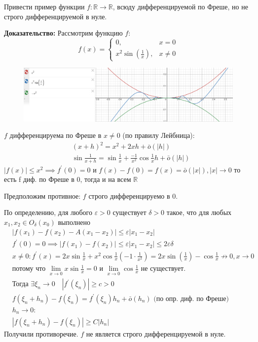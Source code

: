 \begin{task}
Привести пример функции $f: \mathbb{R} \rightarrow \mathbb{R}$, всюду дифференцируемой по Фреше, но не строго дифференцируемой в нуле.

\textbf{Доказательство:}
Рассмотрим функцию $f$:
\[
f(x)= \begin{cases}0, & x=0 \\ x^2 \sin \left(\frac{1}{x}\right), & x \neq 0\end{cases} 
\]

\begin{figure}[h!]
\centering
\includegraphics[width=0.99\linewidth]{tasks/task10/image.png}
\end{figure}
 
$f$ дифференцируема по Фреше в $x \neq 0$ (по правилу Лейбница):
\[\begin{aligned}
& {(x + h)}^{2} = x^2 +2xh+ \bar{o}(|h|)\\
& \sin{\frac{1}{x+h}} = \sin{\frac{1}{x}} + \frac{-1}{x^2} \cos{\frac{1}{x}}h + \bar{o}(|h|)
\end{aligned}\]
$|f(x)| \leq x^2 \implies f^{\prime}(0)=0$ и $f(x)-f(0)=f(x) =\bar{o}(|x|), |x| \rightarrow 0 $
то есть f диф. по Фреше в 0, тогда и на всем $\mathbb{R}$

Предположим противное: $f$ строго дифференцируемо в $0$.

По определению,  для любого $\varepsilon>0$ существует $\delta>0$ такое, что для любых $x_1, x_2 \in O_\delta\left(x_0\right)$ выполнено
\[\begin{aligned}
&|f\left(x_1\right)-f\left(x_2\right)-A\left(x_1-x_2\right)|\leq \varepsilon|x_1-x_2| \\
&f^{\prime}(0)=0 \implies |f\left(x_1\right)-f\left(x_2\right)|\leq \varepsilon|x_1-x_2|\leq 2\varepsilon \delta \\
& x\neq 0:  f^{\prime}(x)=2 x \sin \frac{1}{x}+x^2 \cos \frac{1}{x}\left(-1 \cdot \frac{1}{x^2}\right)=2 x \sin \left(\frac{1}{x}\right)-\cos \frac{1}{x} \nrightarrow 0, x \rightarrow 0 \\
& \text{потому что } \lim _{x \rightarrow 0} x \sin \frac{1}{x}=0 \text{ и } \lim _{x \rightarrow 0} \cos \frac{1}{x} \text{ не существует.} \\
& \text{Тогда }\exists \xi_n \rightarrow 0 \quad\left|f^{\prime}\left(\xi_n\right)\right| \geqslant c>0 \\
& f\left(\xi_n+h_n\right)-f\left(\xi_n\right)=f^{\prime}\left(\xi_n\right) h_n+\bar{o}\left(h_n\right) \text{ (по опр. диф. по Фреше)}\\
& h_n \longrightarrow 0 :\\
& \left|f\left(\xi_n+h_n\right)-f\left(\xi_n\right)\right| \geqslant C\left|h_n\right|
\end{aligned}\]
Получили противоречие. $f$ не является строго дифференцируемой в нуле.
\end{task}
